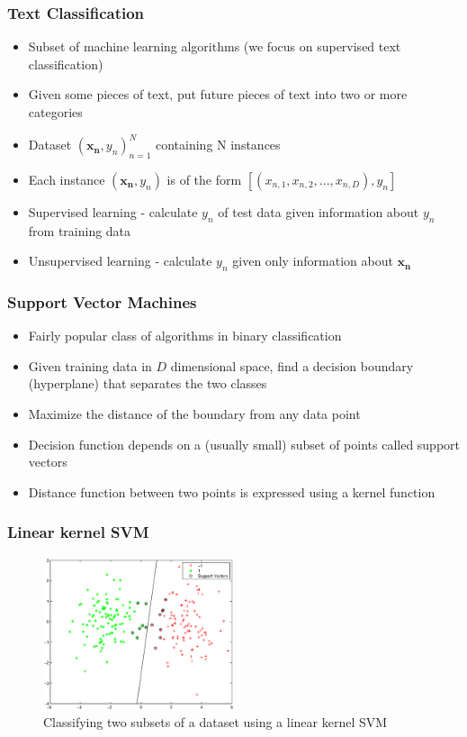 \documentclass{beamer}
\begin{document}
    \begin{frame}
        \frametitle{Text Classification}
        \begin{itemize}
            \item{Subset of machine learning algorithms (we focus on supervised text classification)}
            \item{Given some pieces of text, put future pieces of text into two or more categories}
            \item{Dataset ${(\mathbf{x_n}, y_n)}_{n = 1}^{N}$ containing N instances}
            \item{Each instance $(\mathbf{x_n}, y_n)$ is of the form $[(x_{n, 1}, x_{n, 2}, ..., x_{n, D}), y_n]$}
            \item{Supervised learning - calculate $y_n$ of test data given information about $y_n$ from training data}
            \item{Unsupervised learning - calculate $y_n$ given only information about $\mathbf{x_n}$}
        \end{itemize}
    \end{frame}
    
    \begin{frame}
        \frametitle{Support Vector Machines}
        \begin{itemize}
            \item{Fairly popular class of algorithms in binary classification}
            \item{Given training data in $D$ dimensional space, find a decision boundary (hyperplane) that separates the two classes}
            \item{Maximize the distance of the boundary from any data point}
            \item{Decision function depends on a (usually small) subset of points called support vectors}
            \item{Distance function between two points is expressed using a kernel function}
        \end{itemize}
    \end{frame}
    
    \begin{frame}
        \frametitle{Linear kernel SVM}
        \begin{figure}
            \centering
            \includegraphics[width=0.5\textwidth]{figures/svm_linear_classification.eps}
            \caption{Classifying two subsets of a dataset using a linear kernel SVM}
        \end{figure}
    \end{frame}
    
\end{document}
